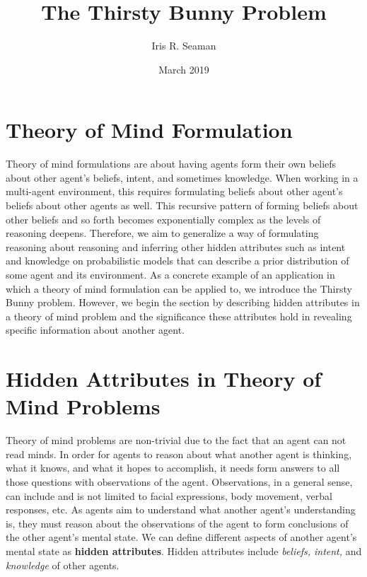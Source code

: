 \documentclass[twocolumn]{article}
\title{The Thirsty Bunny Problem}
\author{Iris R. Seaman}
\date{March 2019}
\begin{document}
\maketitle

\section{Theory of Mind Formulation}
Theory of mind formulations are about having agents form their own beliefs about other agent's beliefs, intent, and sometimes knowledge. When working in a multi-agent environment, this requires formulating beliefs about other agent's beliefs about other agents as well. This recursive pattern of forming beliefs about other beliefs and so forth becomes exponentially complex as the levels of reasoning deepens. Therefore, we aim to generalize a way of formulating reasoning about reasoning and inferring other hidden attributes such as intent and knowledge on probabilistic models that can describe a prior distribution of some agent and its environment. As a concrete example of an application in which a theory of mind formulation can be applied to, we introduce the Thirsty Bunny problem. However, we begin the section by describing hidden attributes in a theory of mind problem and the significance these attributes hold in revealing specific information about another agent. 

\section{Hidden Attributes in Theory of Mind Problems}

Theory of mind problems are non-trivial due to the fact that an agent can not read minds. In order for agents to reason about what another agent is thinking, what it knows, and what it hopes to accomplish, it needs form answers to all those questions with observations of the agent. Observations, in a general sense, can include and is not limited to facial expressions, body movement, verbal responses, etc. 
As agents aim to understand what another agent's understanding is, they must reason about the observations of the agent to form conclusions of the other agent's mental state. We can define different aspects of another agent's mental state as \textbf{hidden attributes}. Hidden attributes include \textit{beliefs, intent,} and \textit{knowledge} of other agents.  
 
\end{document}
